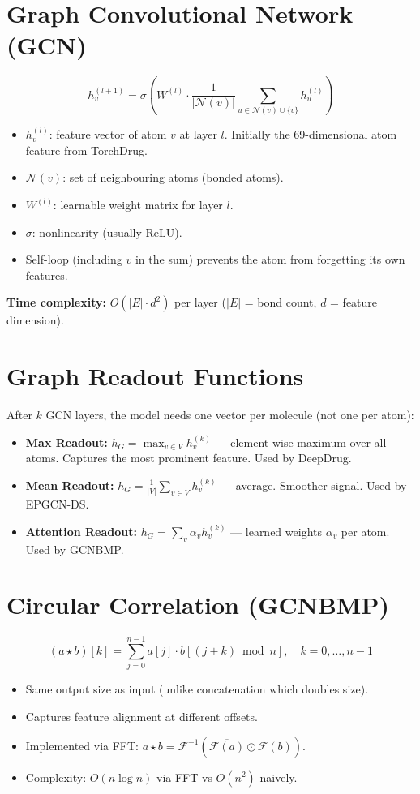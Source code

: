 \documentclass[12pt,a4paper,oneside]{book}
\begin{document}
\section{Graph Convolutional Network (GCN)}
\[h_v^{(l+1)} = \sigma\!\left(W^{(l)} \cdot \frac{1}{|\mathcal{N}(v)|} \sum_{u \in \mathcal{N}(v)\cup\{v\}} h_u^{(l)}\right)\]
\begin{itemize}
  \item $h_v^{(l)}$: feature vector of atom $v$ at layer $l$. Initially the 69-dimensional atom feature from TorchDrug.
  \item $\mathcal{N}(v)$: set of neighbouring atoms (bonded atoms).
  \item $W^{(l)}$: learnable weight matrix for layer $l$.
  \item $\sigma$: nonlinearity (usually ReLU).
  \item Self-loop (including $v$ in the sum) prevents the atom from forgetting its own features.
\end{itemize}
\textbf{Time complexity:} $O(|E| \cdot d^2)$ per layer ($|E|$ = bond count, $d$ = feature dimension).

\section{Graph Readout Functions}
After $k$ GCN layers, the model needs one vector per molecule (not one per atom):
\begin{itemize}
  \item \textbf{Max Readout:} $h_G = \max_{v \in V} h_v^{(k)}$ --- element-wise maximum over all atoms. Captures the most prominent feature. Used by DeepDrug.
  \item \textbf{Mean Readout:} $h_G = \frac{1}{|V|} \sum_{v \in V} h_v^{(k)}$ --- average. Smoother signal. Used by EPGCN-DS.
  \item \textbf{Attention Readout:} $h_G = \sum_v \alpha_v h_v^{(k)}$ --- learned weights $\alpha_v$ per atom. Used by GCNBMP.
\end{itemize}

\section{Circular Correlation (GCNBMP)}
\[(a\star b)[k] = \sum_{j=0}^{n-1} a[j] \cdot b[(j+k)\bmod n], \quad k=0,\ldots,n-1\]
\begin{itemize}
  \item Same output size as input (unlike concatenation which doubles size).
  \item Captures feature alignment at different offsets.
  \item Implemented via FFT: $a\star b = \mathcal{F}^{-1}(\overline{\mathcal{F}(a)} \odot \mathcal{F}(b))$.
  \item Complexity: $O(n\log n)$ via FFT vs $O(n^2)$ naively.
\end{itemize}
\end{document}
